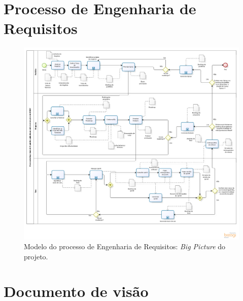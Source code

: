 \begin{anexosenv}

\partanexos

\chapter{Processo de Engenharia de Requisitos}

  \begin{figure}[!htbp]
    \centering
    \includegraphics[scale=0.47, angle = 90]{editaveis/figuras/project_big_picture}
    \caption[Modelo do processo de Engenharia de Requisitos]
	{Modelo do processo de Engenharia de Requisitos: \textit{Big Picture} do projeto.}
    \label{project_big_picture}
  \end{figure}
  
\chapter{Documento de visão}

\end{anexosenv}

